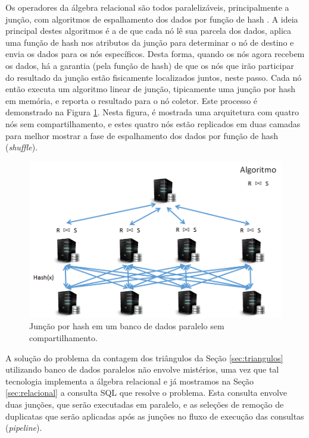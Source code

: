 Os operadores da álgebra relacional são todos paralelizáveis, principalmente
a junção, com algoritmos de espalhamento dos dados por função de hash 
\cite{Schneider1989}. A ideia principal destes algoritmos é a de que cada 
nó lê sua parcela dos dados, aplica uma função de hash nos atributos da
junção para determinar o nó de destino e envia os dados para os nós específicos.
Desta forma, quando os nós agora recebem os dados, há a garantia (pela
função de hash) de que os nós que irão participar do resultado da junção 
estão fisicamente localizados juntos, neste passo. Cada nó então executa um
algoritmo linear de junção, tipicamente uma junção por hash em memória,
e reporta o resultado para o nó coletor. Este processo é demonstrado na 
Figura \ref{fig:mpp_hashjoin}. Nesta figura, é mostrada uma arquitetura
com quatro nós sem compartilhamento, e estes quatro nós estão replicados 
em duas camadas para melhor mostrar a fase de espalhamento dos dados
por função de hash (\emph{shuffle}).

\begin{figure}
        \centering
        \includegraphics[width=\linewidth]{./mpp_hashjoin.png}
        \caption{Junção por hash em um banco de dados paralelo sem compartilhamento.}
        \label{fig:mpp_hashjoin}
\end{figure}

A solução do problema da contagem dos triângulos da Seção \ref{sec:triangulos} utilizando
banco de dados paralelos não envolve mistérios, uma vez que tal tecnologia 
implementa a álgebra relacional e já mostramos na Seção \ref{sec:relacional}
a consulta SQL que resolve o problema. Esta consulta envolve duas junções, 
que serão executadas em paralelo, e as seleções de remoção de duplicatas que
serão aplicadas após as junções no fluxo de execução das consultas (\emph{pipeline}).


